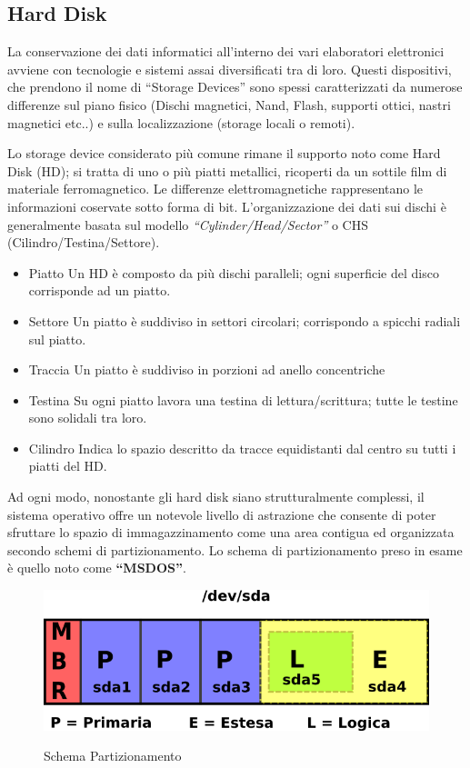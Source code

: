 \subsection{Hard Disk}

La conservazione dei dati informatici all'interno dei vari elaboratori elettronici avviene con tecnologie e sistemi assai diversificati tra di loro. Questi dispositivi, che prendono il nome di ``Storage Devices'' sono spessi caratterizzati da numerose differenze sul piano fisico (Dischi magnetici, Nand, Flash, supporti ottici, nastri magnetici etc..) e sulla localizzazione (storage locali o remoti). 

Lo storage device considerato più comune rimane il supporto noto come Hard Disk (HD); si tratta di uno o più piatti metallici, ricoperti da un sottile film di materiale ferromagnetico. Le differenze elettromagnetiche rappresentano le informazioni coservate sotto forma di bit. 
L'organizzazione dei dati sui dischi è generalmente basata sul modello \textit{``Cylinder/Head/Sector''} o CHS (Cilindro/Testina/Settore).

\begin{itemize}
 \item Piatto
  \subitem Un HD è composto da più dischi paralleli; ogni superficie del disco corrisponde ad un piatto.
 \item Settore
  \subitem Un piatto è suddiviso in settori circolari; corrispondo a spicchi radiali sul piatto.
 \item Traccia
  \subitem Un piatto è suddiviso in porzioni ad anello concentriche
 \item Testina
  \subitem Su ogni piatto lavora una testina di lettura/scrittura; tutte le testine sono solidali tra loro.
 \item Cilindro
  \subitem Indica lo spazio descritto da tracce equidistanti dal centro su tutti i piatti del HD.
\end{itemize}

Ad ogni modo, nonostante gli hard disk siano strutturalmente complessi, il sistema operativo offre un notevole livello di astrazione che consente di poter sfruttare lo spazio di immagazzinamento come una area contigua ed organizzata secondo schemi di partizionamento. Lo schema di partizionamento preso in esame è quello noto come \textbf{``MSDOS''}.

\begin{figure}[!ht]
 \centering
 \includegraphics[scale=0.4]{Immagini/disk_scheme.png}
 \label{fig:DiskScheme}
 \caption{Schema Partizionamento}
\end{figure}

